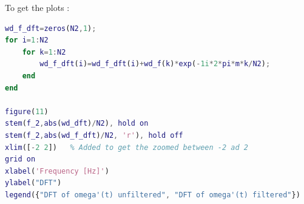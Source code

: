 \documentclass[a4paper,12pt]{article}
\begin{document}
\begin{enumerate}[label={\color{blue}\arabic*)}]
\begin{multicols}{2}
    \end{multicols}
    To get the plots :
    \begin{lstlisting}[style=Matlab-editor,language=Matlab, basicstyle=\small\ttfamily]
wd_f_dft=zeros(N2,1);
for i=1:N2
    for k=1:N2
        wd_f_dft(i)=wd_f_dft(i)+wd_f(k)*exp(-1i*2*pi*m*k/N2);
    end
end

figure(11)
stem(f_2,abs(wd_dft)/N2), hold on
stem(f_2,abs(wd_f_dft)/N2, 'r'), hold off
xlim([-2 2])   % Added to get the zoomed between -2 ad 2
grid on
xlabel('Frequency [Hz]')
ylabel("DFT")
legend({"DFT of omega'(t) unfiltered", "DFT of omega'(t) filtered"})
        \end{lstlisting}

\end{enumerate}
\end{document}
